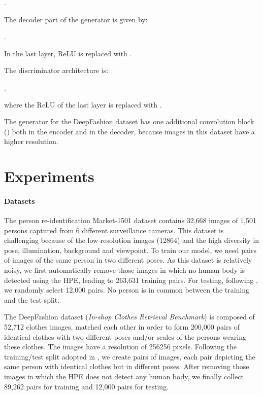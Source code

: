 \documentclass[10pt,twocolumn,letterpaper]{article}
\begin{document}
.

\noindent
The decoder part of the generator is given by:

.

\noindent
In the last  layer,  ReLU is replaced with .

The discriminator architecture is:

,

\noindent
where the  ReLU of the last  layer  is replaced with .

The generator for the DeepFashion dataset has one additional convolution block ()
both in the encoder and in the decoder, because images in this dataset  have a  higher resolution.

 \section{Experiments}
\label{Experiments}

\paragraph{Datasets}

The person re-identification  Market-1501 dataset \cite{zheng2015scalable} contains 32,668 images of 1,501 persons captured from 6 different surveillance cameras. This dataset is challenging because of the low-resolution images (12864) and the high diversity in pose, illumination, background and viewpoint. To train our model, we need pairs of images of the same person in two different poses. As this dataset is relatively noisy, we first automatically remove those images in which no human body is detected using the HPE, leading to 263,631 training pairs.
For testing, following  \cite{ma2017pose}, we  randomly select 12,000 pairs. No person is in common between the training and the test split.
 
The DeepFashion dataset ({\em In-shop Clothes Retrieval Benchmark}) \cite{liu2016deepfashion} is composed of 52,712 clothes images, matched each other in order to form  200,000 pairs of identical clothes with two different poses and/or scales of the persons wearing these clothes. 
The images have a resolution of 256256 pixels. 
Following the training/test split adopted in \cite{ma2017pose}, we create pairs of images, each pair depicting the same person with identical clothes  but in different poses.
After removing those images in which the HPE does not detect any human body, we finally 
 collect 89,262 pairs for training and 12,000 pairs for testing.
\end{document}
